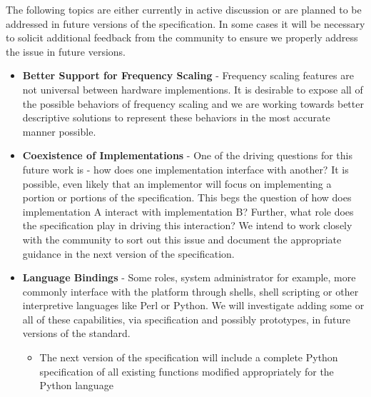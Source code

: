 

The following topics are either currently in active discussion or are planned to be addressed in future versions of the specification.
In some cases it will be necessary to solicit additional feedback from the community to ensure we properly address the issue in future versions.

\begin{itemize}[noitemsep,nolistsep]

\item{\textbf{Better Support for Frequency Scaling} - Frequency scaling features are not universal between hardware implementions. It is desirable to expose all of the possible behaviors of frequency scaling and we are working towards better descriptive solutions to represent these behaviors in the most accurate manner possible.}

\item{\textbf{Coexistence of Implementations} - One of the driving questions for this future work is - how does one implementation interface with another? It is possible, even likely that an implementor will focus on implementing a portion or portions of the specification. This begs the question of how does implementation A interact with implementation B? Further, what role does the specification play in driving this interaction? We intend to work closely with the community to sort out this issue and document the appropriate guidance in the next version of the specification.
}
\item{\textbf{Language Bindings} - Some roles, system administrator for example, more commonly interface with the platform through shells, shell scripting or other interpretive languages like Perl or Python. We will investigate adding some or all of these capabilities, via specification and possibly prototypes, in future versions of the standard.
}
    \begin{itemize}
        \item{The next version of the specification will include a complete Python specification of all existing functions modified appropriately for the Python language}
    \end{itemize}


\end{itemize}

